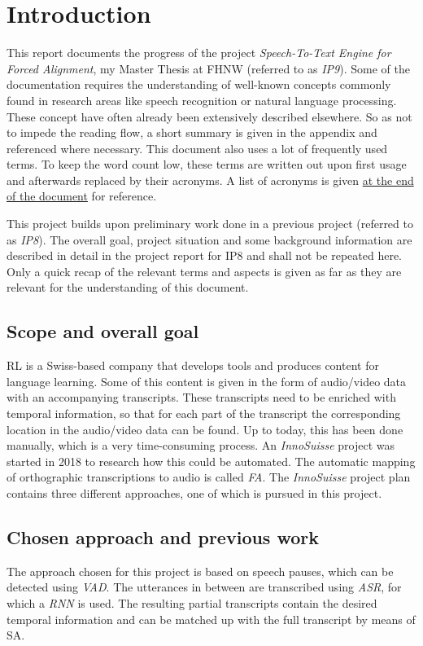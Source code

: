 \section{Introduction}\label{intro}
This report documents the progress of the project \textit{Speech-To-Text Engine for Forced Alignment}, my Master Thesis at \ac{FHNW} (referred to as \textit{IP9}). Some of the documentation requires the understanding of well-known concepts commonly found in research areas like speech recognition or natural language processing. These concept have often already been extensively described elsewhere. So as not to impede the reading flow, a short summary is given in the appendix and referenced where necessary. This document also uses a lot of frequently used terms. To keep the word count low, these terms are written out upon first usage and afterwards replaced by their acronyms. A list of acronyms is given \hyperref[acronyms]{at the end of the document} for reference.

This project builds upon preliminary work done in a previous project (referred to as \textit{IP8}). The overall goal, project situation and some background information are described in detail in the project report for IP8 and shall not be repeated here. Only a quick recap of the relevant terms and aspects is given as far as they are relevant for the understanding of this document.

\subsection{Scope and overall goal}
\ac{RL} is a Swiss-based company that develops tools and produces content for language learning. Some of this content is given in the form of audio/video data with an accompanying transcripts. These transcripts need to be enriched with temporal information, so that for each part of the transcript the corresponding location in the audio/video data can be found. Up to today, this has been done manually, which is a very time-consuming process. An \textit{InnoSuisse} project was started in 2018 to research how this could be automated. The automatic mapping of orthographic transcriptions to audio is called \textit{\ac{FA}}. The \textit{InnoSuisse} project plan contains three different approaches, one of which is pursued in this project.

\subsection{Chosen approach and previous work}
The approach chosen for this project is based on speech pauses, which can be detected using \textit{\ac{VAD}}. The utterances in between are transcribed using \textit{\ac{ASR}}, for which a \textit{\ac{RNN}} is used. The resulting partial transcripts contain the desired temporal information and can be matched up with the full transcript by means of \ac{SA}.


